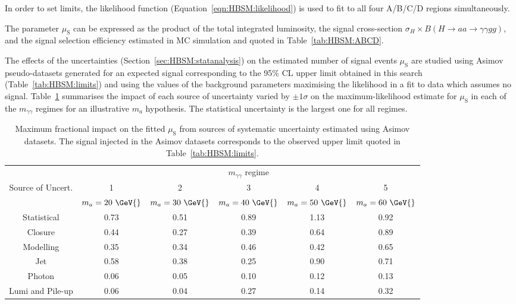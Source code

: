 In order to set limits, the likelihood function (Equation~\ref{eqn:HBSM:likelihood}) is used to fit to all four A/B/C/D regions simultaneously.

The parameter $\mu_\text{S}$ can be expressed as the product of the total integrated luminosity, the signal cross-section 
$\sigma_H\times B(H\to aa\to \gamma\gamma gg)$, and the signal selection efficiency estimated in MC simulation and quoted in Table~\ref{tab:HBSM:ABCD}.

The effects of the uncertainties (Section~\ref{sec:HBSM:statanalysis}) on the estimated number of signal events $\mu_\text{S}$ are studied using Asimov~\cite{Cowan:2010js} pseudo-datasets generated
for an expected signal corresponding to the 95\% CL upper limit obtained in this search (Table~\ref{tab:HBSM:limits}) and using the values of the background 
parameters maximising the likelihood in a fit to data which assumes no signal.
Table~\ref{tab:HBSM:systs} summarises the impact of each source of uncertainty varied by $\pm1\sigma$ on the maximum-likelihood estimate for $\mu_\text{S}$ in each 
of the $m_{\gamma\gamma}$ regimes for an illustrative $m_a$ hypothesis. The statistical uncertainty is the largest one for all regimes.
\begin{table}[t]
  \begin{center}
    \caption{
      Maximum fractional impact on the fitted $\mu_\text{S}$ from sources of systematic uncertainty estimated using Asimov datasets.
      The signal injected in the Asimov datasets corresponds to the observed upper limit quoted in Table~\ref{tab:HBSM:limits}.
    }
    \label{tab:HBSM:systs}
          {\footnotesize
	  \begin{tabular}{cccccc}
	  \hline
          &\multicolumn{5}{c}{$m_{\gamma\gamma}$ regime} \\
          Source of Uncert.   &    1  &   2  &   3  &   4  &   5  \\
            &   $m_a=20~\GeV{}$ &  $m_a=30~\GeV{}$ &  $m_a=40~\GeV{}$ &  $m_a=50~\GeV{}$ &  $m_a=60~\GeV{}$ \\
          \hline
	  Statistical          &     0.73 &     0.51 &     0.89 &     1.13 &     0.92 \\
	  Closure              &     0.44 &     0.27 &     0.39 &     0.64 &     0.89 \\
	  \hline
	  Modelling            &     0.35 &     0.34 &     0.46 &     0.42 &     0.65 \\
	  Jet                  &     0.58 &     0.38 &     0.25 &     0.90 &     0.71 \\
	  Photon               &     0.06 &     0.05 &     0.10 &     0.12 &     0.13 \\
	  Lumi and Pile-up     &     0.06 &     0.04 &     0.27 &     0.14 &     0.32 \\
	  \hline
	  \end{tabular}
          }
  \end{center}
\end{table}

